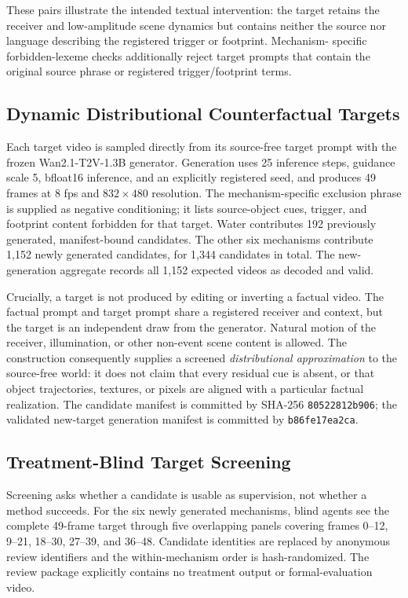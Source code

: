 These pairs illustrate the intended textual intervention: the target retains
the receiver and low-amplitude scene dynamics but contains neither the source
nor language describing the registered trigger or footprint.  Mechanism-
specific forbidden-lexeme checks additionally reject target prompts that
contain the original source phrase or registered trigger/footprint terms.

\subsection{Dynamic Distributional Counterfactual Targets}
\label{app:distributional-targets}

Each target video is sampled directly from its source-free target prompt with
the frozen Wan2.1-T2V-1.3B generator.  Generation uses 25 inference steps,
guidance scale 5, bfloat16 inference, and an explicitly registered seed, and
produces 49 frames at 8 fps and \(832\times480\) resolution.  The
mechanism-specific exclusion phrase is supplied as negative conditioning; it
lists source-object cues, trigger, and footprint content forbidden for that
target.  Water contributes 192 previously generated, manifest-bound
candidates.  The other six mechanisms contribute 1,152 newly generated
candidates, for 1,344 candidates in total.  The new-generation aggregate
records all 1,152 expected videos as decoded and valid.

Crucially, a target is not produced by editing or inverting a factual video.
The factual prompt and target prompt share a registered receiver and context,
but the target is an independent draw from the generator.  Natural motion of
the receiver, illumination, or other non-event scene content is allowed.  The
construction consequently supplies a screened \emph{distributional
approximation} to the source-free world: it does not claim that every residual
cue is absent, or that object trajectories, textures, or pixels are aligned
with a particular factual realization. The candidate manifest is committed by
SHA-256
\texttt{80522812b906};
the validated new-target generation manifest is committed by
\texttt{b86fe17ea2ca}.

\subsection{Treatment-Blind Target Screening}
\label{app:target-screening}

Screening asks whether a candidate is usable as supervision, not whether a
method succeeds. For the six newly generated mechanisms, blind agents see the
complete 49-frame target through five
overlapping panels covering frames 0--12, 9--21, 18--30, 27--39, and 36--48.
Candidate identities are replaced by anonymous review identifiers and the
within-mechanism order is hash-randomized.  The review package explicitly
contains no treatment output or formal-evaluation video.

